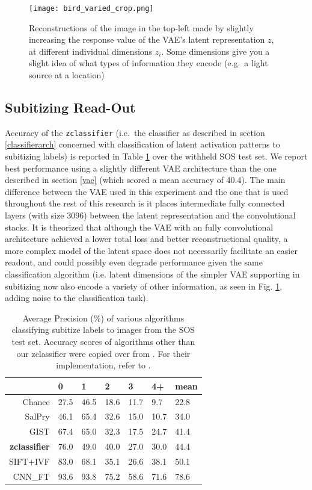\documentclass[twocolumn]{article}
\begin{document}

\begin{figure}
\centering
\texttt{[image: bird\_varied\_crop.png]}
\caption{Reconstructions of the image in the top-left made by slightly
increasing the response value of the VAE's latent representation \(z\),
at different individual dimensions \(z_i\). Some dimensions give
you a slight idea of what types of information they encode (e.g.~a light source at a
location)}
\label{fig:latent}
\end{figure}

\hypertarget{subitizing-read-out}{%
\subsection{Subitizing Read-Out}\label{subitizing-read-out}}

Accuracy of the \texttt{zclassifier} (i.e.~the classifier as described
in section \ref{classifierarch} concerned
with classification of latent activation patterns to subitizing labels)
is reported in Table \ref{tab:sub-performance} over the withheld SOS test set. We report best performance using a slightly different VAE architecture than the one described in
section \ref{vae} (which scored a mean accuracy of 40.4).
The main difference between the VAE used in this experiment and the one
that is used throughout the rest of this research is it places
intermediate fully connected layers (with size 3096) between the latent
representation and the convolutional stacks. It is theorized that although the VAE with an fully convolutional architecture achieved a lower total loss and better reconstructional quality, a more complex model of the latent space does not necessarily facilitate an easier readout, and could possibly even degrade performance given the same classification algorithm (i.e. latent dimensions of the simpler VAE supporting in subitizing now also encode a variety of other information, as seen in Fig. \ref{fig:latent}, adding noise to the classification task). 

\begin{longtable}[]{@{}rllllll@{}}
\caption{Average Precision (\%) of various algorithms classifying subitize labels to images from the SOS test set. Accuracy scores of algorithms other than our zclassifier were copied over from \citet{zhang2016salient}. For their
implementation, refer to \citet{zhang2016salient}. }\label{tab:sub-performance}\\
\toprule
& 0 & 1 & 2 & 3 & 4+ & mean\tabularnewline
\midrule
\endhead
Chance & 27.5 & 46.5 & 18.6 & 11.7 & 9.7 & 22.8\tabularnewline
SalPry & 46.1 & 65.4 & 32.6 & 15.0 & 10.7 & 34.0\tabularnewline
GIST & 67.4 & 65.0 & 32.3 & 17.5 & 24.7 & 41.4\tabularnewline
\textbf{zclassifier} & 76.0 & 49.0 & 40.0 & 27.0 & 30.0 & 44.4\tabularnewline
SIFT+IVF & 83.0 & 68.1 & 35.1 & 26.6 & 38.1 & 50.1\tabularnewline
CNN\_FT & 93.6 & 93.8 & 75.2 & 58.6 & 71.6 & 78.6\tabularnewline
\bottomrule
\end{longtable}
\end{document}
